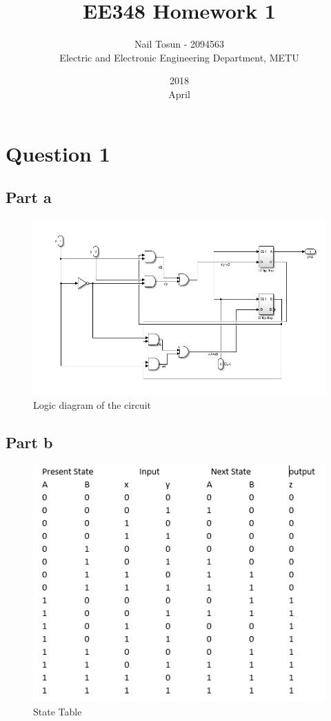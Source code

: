 \documentclass[11 pt]{article}
\title{EE348 Homework 1}
\date{2018\\ April}
\author{Nail Tosun - 2094563 \\ Electric and Electronic Engineering Department, METU}
\begin{document}
\maketitle
\section*{Question 1}
\subsection*{Part a}
\begin{figure}[H]
\centering
  \includegraphics[scale=0.7]{q1}
  \caption{Logic diagram of the circuit}
  \label{fig:zero}
\end{figure}
\subsection*{Part b}
\begin{figure}[H]
\centering
  \includegraphics[scale=0.7]{q1_2}
  \caption{State Table}
  \label{fig:zero}
\end{figure}
\end{document}
